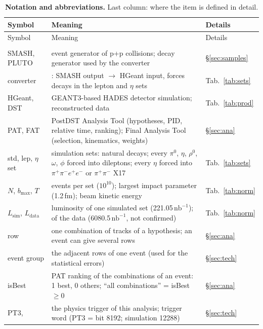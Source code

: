 \documentclass[11pt,a4paper]{article}
\renewcommand{\arraystretch}{1.15}
\newcommand{\piz}{\ensuremath{\pi^{0}}\xspace}
\newcommand{\pipi}{\ensuremath{\pi^{+}\pi^{-}}\xspace}
\newcommand{\ppee}{\ensuremath{\pi^{+}\pi^{-}e^{+}e^{-}}\xspace}
\newcommand{\nbinv}{\ensuremath{\mathrm{nb}^{-1}}\xspace}
\newcommand{\Lsim}{\ensuremath{L_{\mathrm{sim}}}\xspace}
\newcommand{\Ldata}{\ensuremath{L_{\mathrm{data}}}\xspace}
\newcommand{\code}[1]{\texttt{\detokenize{#1}}}
\begin{document}
{\footnotesize
\setlength{\tabcolsep}{4pt}
\renewcommand{\arraystretch}{1.06}
\begin{longtable}{@{}>{\raggedright\arraybackslash}p{3.0cm} >{\raggedright\arraybackslash}p{\dimexpr\textwidth-3.0cm-2.2cm-4\tabcolsep\relax} >{\raggedright\arraybackslash}p{2.2cm}@{}}
\caption{\textbf{Notation and abbreviations.} Last column: where the item is defined in detail.}
\label{tab:notation}\\
\toprule
Symbol & Meaning & Details \\
\midrule
\endfirsthead
\toprule
Symbol & Meaning & Details \\
\midrule
\endhead
\bottomrule
\endfoot
\multicolumn{3}{@{}l}{\textbf{Programs and samples}} \\
SMASH, PLUTO & event generator of p+p collisions; decay generator used by the converter & \S\ref{sec:samples} \\
converter & \code{convert-smash}: SMASH output $\to$ HGeant input, forces decays in the lepton and $\eta$ sets & Tab.~\ref{tab:sets} \\
HGeant, DST & GEANT3-based HADES detector simulation; reconstructed data & Tab.~\ref{tab:prod} \\
PAT, FAT & PostDST Analysis Tool (hypotheses, PID, relative time, ranking); Final Analysis Tool (selection, kinematics, weights) & \S\ref{sec:ana} \\
std, lep, $\eta$ set & simulation sets: natural decays; every \piz, $\eta$, $\rho^0$, $\omega$, $\phi$ forced into dileptons; every $\eta$ forced into \ppee or \pipi X17 & Tab.~\ref{tab:sets} \\
$N$, $b_{\max}$, $T$ & events per set ($10^{10}$); largest impact parameter (1.2\,fm); beam kinetic energy & Tab.~\ref{tab:norm} \\
\Lsim, \Ldata & luminosity of one simulated set (221.05\,\nbinv); of the data (6080.5\,\nbinv, not confirmed) & Tab.~\ref{tab:norm} \\
row & one combination of tracks of a hypothesis; an event can give several rows & \S\ref{sec:ana} \\
event group & the adjacent rows of one event (used for the statistical errors) & \S\ref{sec:tech} \\
isBest & PAT ranking of the combinations of an event: 1 best, 0 others; ``all combinations'' = isBest $\ge0$ & \S\ref{sec:ana} \\
PT3, \code{trigbit} & the physics trigger of this analysis; trigger word (PT3 = bit 8192; simulation 12288) & \S\ref{sec:tech} \\

\end{longtable}}
\end{document}
